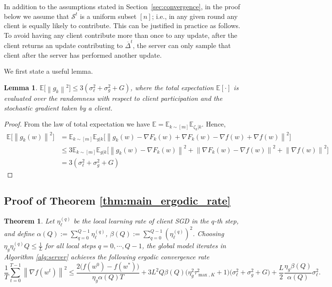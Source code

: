 \documentclass[twoside]{article}
\newcommand{\calS}{\mathcal{S}}
\newtheorem{theorem}{Theorem}
\newtheorem{lemma}{Lemma}
\newcommand{\norm}[1]{\left\lVert#1\right\rVert}
\begin{document}
In addition to the assumptions stated in Section~\ref{sec:convergence}, in the proof below we assume that $\calS^t$ is a uniform subset $[n]$; i.e., in any given round any client is equally likely to contribute. This can be justified in practice as follows. To avoid having any client contribute more than once to any update, after the client returns an update contributing to $\overline{\Delta}^t$, the server can only sample that client after the server has performed another update. 

We first state a useful lemma.
\begin{lemma}
$\mathbb{E}\Big[\norm{g_k}^2\Big] \leq 3(\sigma^2_{\ell} + \sigma^2_g + G)$, where the total expectation $\mathbb{E}[\cdot]$ is evaluated over the randomness with respect to client participation and the stochastic gradient taken by a client. 
\label{ref:lemma_totalexpectation}
\end{lemma}

\begin{proof}
From the law of total expectation we have $\mathbb{E} = 
\mathbb{E}_{k\sim[m]}  \mathbb{E}_{\zeta_k | k}$. Hence,
\begin{equation}
    \begin{aligned}
            \mathbb{E}\Big[\norm{g_k(w)}^2\Big] &= \mathbb{E}_{k\sim[m]}  \mathbb{E}_{g | k}\Big[\norm{g_k(w) - \nabla F_k(w) + \nabla F_k(w) - \nabla f(w) + \nabla f(w)}^2\Big] \\
            &\leq 3 \mathbb{E}_{k\sim[m]} \mathbb{E}_{g | k} \Big[\norm{g_k(w) - \nabla F_k(w)}^2 + \norm{\nabla F_k(w) - \nabla f(w)}^2 + \norm{\nabla f(w)}^2 \Big] \\
            &= 3(\sigma^2_{\ell} + \sigma^2_g + G )
    \end{aligned}
\end{equation}
\end{proof}

\subsection{Proof of Theorem \ref{thm:main_ergodic_rate}}
\begin{theorem}
Let $\eta^{(q)}_{\ell}$ be the local learning rate of client SGD in the $q$-th step, and define $\alpha(Q):=\sum_{q=0}^{Q-1} \eta^{(q)}_{\ell}$, $\beta(Q):=\sum_{q=0}^{Q-1} (\eta^{(q)}_{\ell})^2$. Choosing $\eta_g \eta^{(q)}_{\ell} Q \leq \frac{1}{L}$ for all local steps $q=0,\cdots,Q-1$, the global model iterates in Algorithm \ref{alg:server} achieves the following ergodic convergence rate
\begin{equation}
        \frac{1}{T} \sum_{t=0}^{T-1} \norm{\nabla f(w^t)}^2
        \leq \frac{2 \Big(f(w^0) - f(w^*) \Big)}{\eta_g \alpha(Q) T} + 3 L^2 Q  \beta(Q)\Big(\eta^2_g \tau_{\max, K}^2 + 1 \Big)  \Big(\sigma^2_{\ell} + \sigma^2_g +  G\Big)
        +\frac{L}{2}\frac{\eta_g \beta(Q) }{ \alpha(Q)}   \sigma^2_{\ell} .
\end{equation}
\end{theorem}
\end{document}
